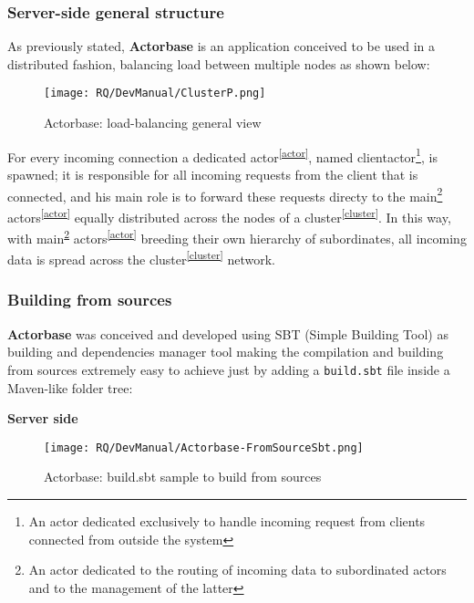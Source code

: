 \documentclass{scalatekids-article}
\begin{document}
\subsubsection{Server-side general structure}

As previously stated, \textbf{Actorbase} is an application conceived to be used in a distributed fashion,
balancing load between multiple nodes as shown below:

\begin{figure}[H]
  \begin{center}
    \texttt{[image: RQ/DevManual/ClusterP.png]}
    \caption{Actorbase: load-balancing general view}
  \end{center}
\end{figure}

For every incoming connection a dedicated actor\textsuperscript{\ref{actor}}, named clientactor\footnote{An actor dedicated
exclusively to handle incoming request from clients connected from outside the
system}, is spawned; it is responsible for all incoming requests from the
client that is connected, and his main role is to forward these requests directy to the
main\footnote{An actor dedicated to the routing of incoming data to subordinated
actors and to the management of the latter\label{main}}
actors\textsuperscript{\ref{actor}} equally distributed across the nodes of a
cluster\textsuperscript{\ref{cluster}}. In this way, with
main\textsuperscript{\ref{main}} actors\textsuperscript{\ref{actor}} breeding
their own hierarchy of subordinates, all incoming data is spread across the
cluster\textsuperscript{\ref{cluster}} network.

\subsubsection{Building from sources}

\textbf{Actorbase} was conceived and developed using SBT (Simple Building Tool) as building and dependencies
manager tool making the compilation and building from sources extremely easy to achieve just by adding a
\verb=build.sbt= file inside a Maven-like folder tree:

\textbf{Server side}

 \begin{figure}[H]
   \begin{center}
     \texttt{[image: RQ/DevManual/Actorbase-FromSourceSbt.png]}
     \caption{Actorbase: build.sbt sample to build from sources}
   \end{center}
 \end{figure}
\end{document}
